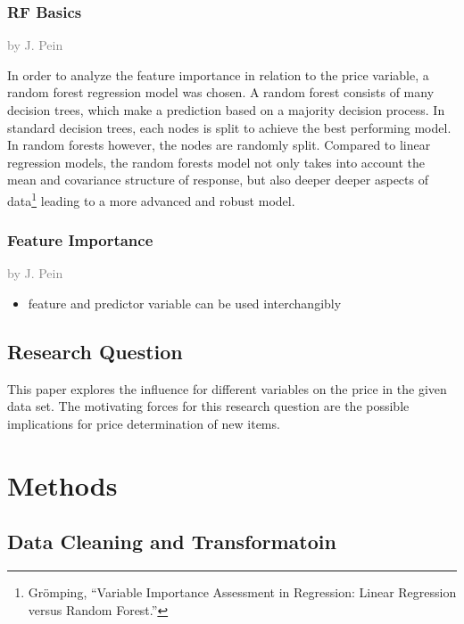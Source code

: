 \documentclass[a4paper, nobind]{templates/ociamthesis}
\providecommand{\tightlist}{%
  \setlength{\itemsep}{0pt}\setlength{\parskip}{0pt}}
\begin{document}
\hypertarget{rf-basics}{%
\subsection{RF Basics}\label{rf-basics}}

\textcolor{gray}{by J. Pein}

In order to analyze the feature importance in relation to the price variable, a random forest regression model was chosen. A random forest consists of many decision trees, which make a prediction based on a majority decision process. In standard decision trees, each nodes is split to achieve the best performing model. In random forests however, the nodes are randomly split. Compared to linear regression models, the random forests model not only takes into account the mean and covariance structure of response, but also deeper deeper aspects of data\footnote{Grömping, ``Variable Importance Assessment in Regression: Linear Regression versus Random Forest.''} leading to a more advanced and robust model.

\hypertarget{feature-importance}{%
\subsection{Feature Importance}\label{feature-importance}}

\textcolor{gray}{by J. Pein}

\begin{itemize}
\tightlist
\item
  feature and predictor variable can be used interchangibly
\end{itemize}

\hypertarget{research_question}{%
\section{Research Question}\label{research_question}}

This paper explores the influence for different variables on the price in the given data set. The motivating forces for this research question are the possible implications for price determination of new items.

\hypertarget{methods}{%
\chapter{Methods}\label{methods}}

\hypertarget{datacleaning}{%
\section{Data Cleaning and Transformatoin}\label{datacleaning}}
\end{document}
